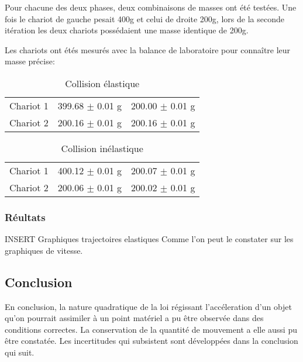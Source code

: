 Pour chacune des deux phases, deux combinaisons de masses ont été testées. Une fois le chariot de gauche pesait 400g et celui de droite 200g, lors de la seconde itération les deux chariots possédaient une masse identique de 200g.

Les chariots ont étés mesurés avec la balance de laboratoire pour connaître leur masse précise:
\begin{table}[h]
    \centering
    \caption{Collision élastique}
    \begin{tabular}{|l|l|l|}
	\hline
	Chariot 1 & 399.68 $\pm$ 0.01 g & 200.00 $\pm$ 0.01 g \\
	Chariot 2 & 200.16 $\pm$ 0.01 g & 200.16 $\pm$ 0.01 g \\
	\hline
    \end{tabular}
\end{table}

\begin{table}[h]
    \centering
    \caption{Collision inélastique}
    \begin{tabular}{|l|l|l|}
	\hline
	Chariot 1 & 400.12 $\pm$ 0.01 g & 200.07 $\pm$ 0.01 g \\
	Chariot 2 & 200.06 $\pm$ 0.01 g & 200.02 $\pm$ 0.01 g \\
	\hline
    \end{tabular}
\end{table}


\subsubsection{Réultats}

INSERT Graphiques trajectoires elastiques
Comme l'on peut le constater sur les graphiques de vitesse.

\subsection{Conclusion}
En conclusion, la nature quadratique de la loi régissant l'accéleration d'un objet qu'on pourrait assimiler à un point matériel a pu être observée dans des conditions correctes.
La conservation de la quantité de mouvement a elle aussi pu être constatée. Les incertitudes qui subsistent sont développées dans la conclusion qui suit.

